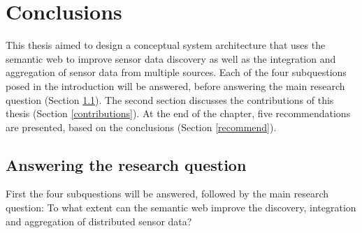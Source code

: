 

\chapter{Conclusions}
\label{chap:conclusion}

This thesis aimed to design a conceptual system architecture that uses the semantic web to improve sensor data discovery as well as the integration and aggregation of sensor data from multiple sources. Each of the four subquestions posed in the introduction will be answered, before answering the main research question (Section \ref{subquestions}). The second section discusses the contributions of this thesis (Section \ref{contributions}). At the end of the chapter, five recommendations are presented, based on the conclusions (Section \ref{recommend}).

\section{Answering the research question}
\label{subquestions}

First the four subquestions will be answered, followed by the main research question: To what extent can the semantic web improve the discovery, integration and aggregation of distributed sensor data?

